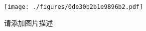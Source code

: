 
\begin{figure}[ht]
\centering
\texttt{[image: ./figures/0de30b2b1e9896b2.pdf]}
\caption{请添加图片描述} \label{fig_thanks_1}
\end{figure}
